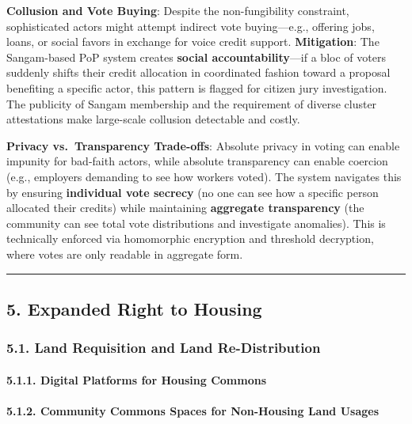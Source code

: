 \textbf{Collusion and Vote Buying}: Despite the non-fungibility
constraint, sophisticated actors might attempt indirect vote
buying---e.g., offering jobs, loans, or social favors in exchange for
voice credit support. \textbf{Mitigation}: The Sangam-based PoP system
creates \textbf{social accountability}---if a bloc of voters suddenly
shifts their credit allocation in coordinated fashion toward a proposal
benefiting a specific actor, this pattern is flagged for citizen jury
investigation. The publicity of Sangam membership and the requirement of
diverse cluster attestations make large-scale collusion detectable and
costly.

\textbf{Privacy vs.~Transparency Trade-offs}: Absolute privacy in voting
can enable impunity for bad-faith actors, while absolute transparency
can enable coercion (e.g., employers demanding to see how workers
voted). The system navigates this by ensuring \textbf{individual vote
secrecy} (no one can see how a specific person allocated their credits)
while maintaining \textbf{aggregate transparency} (the community can see
total vote distributions and investigate anomalies). This is technically
enforced via homomorphic encryption and threshold decryption, where
votes are only readable in aggregate form.

\begin{center}\rule{0.5\linewidth}{0.5pt}\end{center}

\subsection{5. Expanded Right to
Housing}\label{expanded-right-to-housing}

\subsubsection{5.1. Land Requisition and Land
Re-Distribution}\label{land-requisition-and-land-re-distribution}

\paragraph{5.1.1. Digital Platforms for Housing
Commons}\label{digital-platforms-for-housing-commons}

\paragraph{5.1.2. Community Commons Spaces for Non-Housing Land
Usages}\label{community-commons-spaces-for-non-housing-land-usages}

